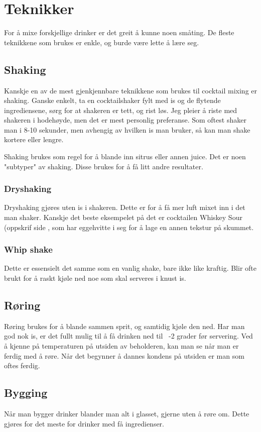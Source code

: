 \section{Teknikker}
For å mixe forskjellige drinker er det greit å kunne noen småting. De fleste teknikkene som brukes er enkle, og burde være lette å lære seg. 
\subsection{Shaking}
Kanskje en av de mest gjenkjennbare teknikkene som brukes til cocktail mixing er shaking. Ganske enkelt, ta en cocktailshaker fylt med is og de flytende ingrediensene, sørg for at shakeren er tett, og rist løs. Jeg pleier å riste med shakeren i hodehøyde, men det er mest personlig preferanse. Som oftest shaker man i 8-10 sekunder, men avhengig av hvilken is man bruker, så kan man shake kortere eller lengre.

Shaking brukes som regel for å blande inn sitrus eller annen juice. Det er noen "subtyper" av shaking. Disse brukes for å få litt andre resultater.

\subsubsection{Dryshaking}
Dryshaking gjøres uten is i shakeren. Dette er for å få mer luft mixet inn i det man shaker. Kanskje det beste eksempelet på det er cocktailen Whiskey Sour (oppskrif side \pageref{drink:w_sour}, som har eggehvitte i seg for å lage en annen tekstur på skummet. 

\subsubsection{Whip shake}
Dette er essensielt det samme som en vanlig shake, bare ikke like kraftig. Blir ofte brukt for å raskt kjøle ned noe som skal serveres i knust is.

\subsection{Røring}
Røring brukes for å blande sammen sprit, og samtidig kjøle den ned. Har man god nok is, er det fullt mulig til å få drinken ned til ~-2 grader før servering. Ved å kjenne på temperaturen på utsiden av beholderen, kan man se når man er ferdig med å røre. Når det begynner å dannes kondens på utsiden er man som oftes ferdig.
\subsection{Bygging}
Når man bygger drinker blander man alt i glasset, gjerne uten å røre om. Dette gjøres for det meste for drinker med få ingredienser.

